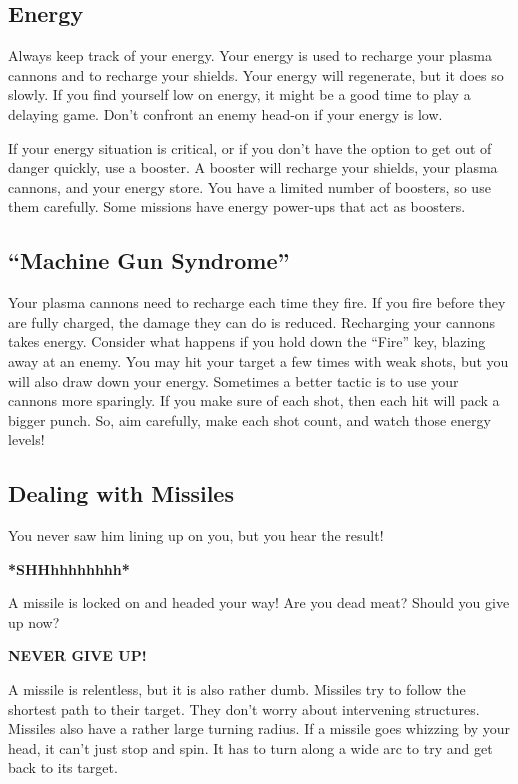 \documentclass{article}
\begin{document}
\subsection{Energy}
Always keep track of your energy. Your energy is used to recharge your plasma cannons and to recharge your shields. Your energy will regenerate, but it does so slowly. If you find yourself low on energy, it might be a good time to play a delaying game. Don't confront an enemy head-on if your energy is low.

If your energy situation is critical, or if you don't have the option to get out of danger quickly, use a booster. A booster will recharge your shields, your plasma cannons, and your energy store. You have a limited number of boosters, so use them carefully. Some missions have energy power-ups that act as boosters.

\subsection{“Machine Gun Syndrome”}
Your plasma cannons need to recharge each time they fire. If you fire before they are fully charged, the damage they can do is reduced. Recharging your cannons takes energy. Consider what happens if you hold down the ``Fire'' key, blazing away at an enemy. You may hit your target a few times with weak shots, but you will also draw down your energy. Sometimes a better tactic is to use your cannons more sparingly. If you make sure of each shot, then each hit will pack a bigger punch. So, aim carefully, make each shot count, and watch those energy levels!

\subsection{Dealing with Missiles}
You never saw him lining up on you, but you hear the result!

\textbf{*SHHhhhhhhhh*}

A missile is locked on and headed your way! Are you dead meat? Should you give up now?

\textbf{NEVER GIVE UP!}

A missile is relentless, but it is also rather dumb. Missiles try to follow the shortest path to their target. They don't worry about intervening structures. Missiles also have a rather large turning radius. If a missile goes whizzing by your head, it can't just stop and spin. It has to turn along a wide arc to try and get back to its target.
\end{document}
